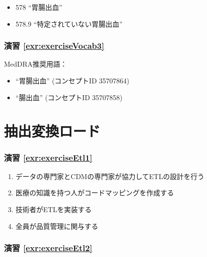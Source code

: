 \documentclass[
  11pt]{book}
\providecommand{\tightlist}{%
  \setlength{\itemsep}{0pt}\setlength{\parskip}{0pt}}
\theoremstyle{definition}
\theoremstyle{definition}
\theoremstyle{definition}
\theoremstyle{definition}
\theoremstyle{remark}
\begin{document}
\begin{itemize}
\tightlist
\item
  578 ``胃腸出血''
\item
  578.9 ``特定されていない胃腸出血''
\end{itemize}

\subsubsection*{演習 \ref{exr:exerciseVocab3}}\label{ux6f14ux7fd2-refexrexercisevocab3}

MedDRA推奨用語：

\begin{itemize}
\tightlist
\item
  ``胃腸出血'' (コンセプトID 35707864)
\item
  ``腸出血'' (コンセプトID 35707858)
\end{itemize}

\section{抽出変換ロード}\label{Etlanswers}

\subsubsection*{演習 \ref{exr:exerciseEtl1}}\label{ux6f14ux7fd2-refexrexerciseetl1}

\begin{enumerate}
\def\labelenumi{\Alph{enumi})}
\tightlist
\item
  データの専門家とCDMの専門家が協力してETLの設計を行う
\item
  医療の知識を持つ人がコードマッピングを作成する
\item
  技術者がETLを実装する
\item
  全員が品質管理に関与する
\end{enumerate}

\subsubsection*{演習 \ref{exr:exerciseEtl2}}\label{ux6f14ux7fd2-refexrexerciseetl2}
\end{document}
